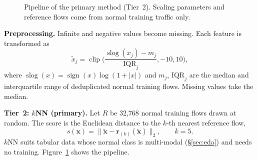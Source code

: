 \documentclass[11pt]{article}
\begin{document}
\begin{figure}[t]
\centering
{}
\caption{Pipeline of the primary method (Tier~2). Scaling parameters and reference flows come from normal training traffic only.}
\label{fig:pipeline}
\end{figure}

\textbf{Preprocessing.} Infinite and negative values become missing. Each feature is transformed as
\begin{equation}
\tilde{x}_j=\operatorname{clip}\!\Big(\frac{\operatorname{slog}(x_j)-m_j}{\mathrm{IQR}_j},-10,10\Big),
\end{equation}
where $\operatorname{slog}(x)=\operatorname{sign}(x)\log(1+|x|)$ and $m_j$, $\mathrm{IQR}_j$ are the median and interquartile range of deduplicated normal training flows. Missing values take the median.

\textbf{Tier~2: $k$NN (primary).} Let $R$ be 32,768 normal training flows drawn at random. The score is the Euclidean distance to the $k$-th nearest reference flow,
\begin{equation}
s(\mathbf{x})=\lVert\tilde{\mathbf{x}}-\mathbf{r}_{(k)}(\tilde{\mathbf{x}})\rVert_2,\qquad k=5 .
\end{equation}
$k$NN suits tabular data whose normal class is multi-modal (\S\ref{sec:eda}) and needs no training. Figure~\ref{fig:pipeline} shows the pipeline.
\end{document}
